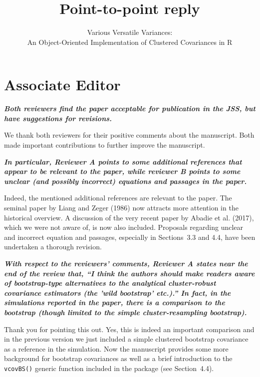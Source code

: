 \documentclass[10pt,a4paper]{article}
\begin{document}
\title{Point-to-point reply}
\author{Various Versatile Variances:\\ An Object-Oriented Implementation of Clustered Covariances in R}
\date{}
\maketitle

\section*{Associate Editor}

\textbf{\textit{Both reviewers find the paper acceptable for publication in the JSS, but
have suggestions for revisions.}}

\medskip

We thank both reviewers for their positive comments about the manuscript. Both made important contributions to further improve the manuscript.
 
\medskip  

\textbf{\textit{In particular, Reviewer A points to some additional references that appear
to be relevant to the paper, while reviewer B points to some unclear (and
possibly incorrect) equations and passages in the paper.}}

\medskip

Indeed, the mentioned additional references are relevant to the paper. The seminal paper by Liang and Zeger (1986) now attracts more attention in the historical overview. 
A discussion of the very recent paper by Abadie et al. (2017), which we were not aware of, is now also included. 
Proposals regarding unclear and incorrect equation and passages, especially in Sections~3.3 and 4.4, have been undertaken a thorough revision. 

\medskip 

\textbf{\textit{With respect to the reviewers' comments, Reviewer A states near the end of
the review that, ``I think the authors should make readers aware of
bootstrap-type alternatives to the analytical cluster-robust covariance
estimators (the 'wild bootstrap' etc.).'' In fact, in the simulations
reported in the paper, there is a comparison to the bootstrap (though
limited to the simple cluster-resampling bootstrap).}}

\medskip

Thank you for pointing this out. Yes, this is indeed an important comparison and
in the previous version we just included a simple clustered bootstrap covariance
as a reference in the simulation. Now the manuscript provides some more background
for bootstrap covariances as well as a brief introduction to the \texttt{vcovBS()}
generic function included in the package (see Section~4.4).
\end{document}
